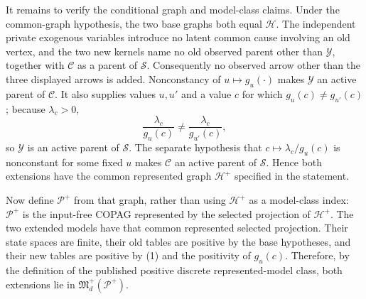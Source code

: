 It remains to verify the conditional graph and model-class claims. Under the common-graph hypothesis, the two base graphs both equal \(\mathcal H\). The independent private exogenous variables introduce no latent common cause involving an old vertex, and the two new kernels name no old observed parent other than \(\mathcal Y\), together with \(\mathcal C\) as a parent of \(\mathcal S\). Consequently no observed arrow other than the three displayed arrows is added. Nonconstancy of \(u\mapsto g_u(\cdot)\) makes \(\mathcal Y\) an active parent of \(\mathcal C\). It also supplies values \(u,u'\) and a value \(c\) for which \(g_u(c)\ne g_{u'}(c)\); because \(\lambda_c>0\),
\[
 \frac{\lambda_c}{g_u(c)}
 \ne
 \frac{\lambda_c}{g_{u'}(c)},                            \tag{11}
\]
so \(\mathcal Y\) is an active parent of \(\mathcal S\). The separate hypothesis that \(c\mapsto\lambda_c/g_u(c)\) is nonconstant for some fixed \(u\) makes \(\mathcal C\) an active parent of \(\mathcal S\). Hence both extensions have the common represented graph \(\mathcal H^+\) specified in the statement.

Now define \(\mathcal P^+\) from that graph, rather than using \(\mathcal H^+\) as a model-class index: \(\mathcal P^+\) is the input-free COPAG represented by the selected projection of \(\mathcal H^+\). The two extended models have that common represented selected projection. Their state spaces are finite, their old tables are positive by the base hypotheses, and their new tables are positive by (1) and the positivity of \(g_u(c)\). Therefore, by the definition of the published positive discrete represented-model class, both extensions lie in \(\mathfrak M_d^+(\mathcal P^+)\).

